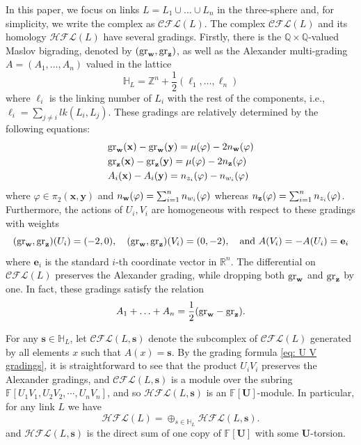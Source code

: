 \documentclass{amsart}
\newtheorem{proposition}[theorem]{Proposition}
\newcommand{\F}{\mathbb{F}}
\newcommand{\cCFL}{\mathcal{C\!F\!L}}
\newcommand{\cHFL}{\mathcal{H\!F\! L}}
\newcommand{\ee}{\mathbf{e}}
\newcommand{\w}{\mathbf{w}}
\newcommand{\x}{\mathbf{x}}
\newcommand{\y}{\mathbf{y}}
\def\gr{\textup{gr}}
\def\w{{\bf{w}}}
\def\z{{\bf{z}}}
\def\x{\mathbf{x}}
\def\y{\mathbf{y}}
\newcommand{\HH}{\mathbb{H}}
\newcommand{\Z}{\mathbb{Z}}
\newcommand{\R}{\mathbb{R}}
\newcommand{\UU}{\mathbf{U}}
\newcommand{\EG}[1]{{\color{red}#1}}
\renewcommand{\ss}{\mathbf{s}}
\begin{document}
In this paper, we focus on links $L=L_1\cup \ldots \cup L_n$ in the three-sphere and, for simplicity, we write the complex as $\cCFL(L)$. The complex $\cCFL(L)$ and its homology $\cHFL(L)$ have several gradings. Firstly, there is the $\mathbb{Q}\times \mathbb{Q}$-valued Maslov bigrading, denoted by $(\gr_{\w}, \gr_{\z})$, as well as the Alexander multi-grading $A=(A_1, \ldots, A_n)$ valued in the lattice
$$\HH_L=\Z^n+\dfrac{1}{2}(\ell_1, \ldots, \ell_n)$$
where $\ell_i$ is the linking number of $L_i$ with the rest of the components, i.e., $\ell_i=\sum_{j\neq i} lk(L_i, L_j)$. These gradings are relatively determined by the following equations:
\begin{equation}\label{eq:relgradings}
\begin{split}
&\gr_{\w}(\x)-\gr_{\w}(\y)=\mu(\varphi)-2n_{\w}(\varphi)\\
&\gr_{\z}(\x)-\gr_{\z}(\y)=\mu(\varphi)-2n_{\z}(\varphi)\\
&A_i(\x)-A_{i}(\y)=n_{z_i}(\varphi)-n_{w_i}(\varphi)
\end{split}
\end{equation}
where $\varphi\in\pi_2(\x,\y)$ and $n_{\w}(\varphi)=\sum_{i=1}^nn_{w_i}(\varphi)$ whereas $n_{\z}(\varphi)=\sum_{i=1}^nn_{z_i}(\varphi)$. Furthermore, the actions of $U_i,V_i$ are homogeneous with respect to these gradings with weights
\begin{equation}
\label{eq: U V gradings}    
(\gr_{\w}, \gr_{\z})(U_i)=(-2, 0), \quad (\gr_{\w}, \gr_{\z})(V_i)=(0, -2), \quad \text{and } A(V_i)=-A(U_i)=\ee_i
\end{equation}
where $\ee_i$ is the standard $i$-th coordinate vector in $\R^n$. 
The differential on $\cCFL(L)$ preserves the Alexander grading, while dropping both $\gr_{\w}$ and $\gr_{\z}$ by  one. In fact, these gradings satisfy the relation
$$A_1+\ldots+A_n=\frac{1}{2} (\gr_{\w}-\gr_{\z}).$$






For any $\ss\in \HH_L$, let $\cCFL(L, \ss)$ denote the subcomplex of $\cCFL(L)$ generated by all elements $x$ such that $A(x)=\ss$. By the grading formula \eqref{eq: U V gradings}, it is straightforward to see that the product $U_iV_i$ preserves the Alexander gradings, and $\cCFL(L, \ss)$ is a module over the subring $\F[U_1V_1, U_2V_2, \cdots, U_nV_n]$, and so $\cHFL(L, \ss)$ is an $\F[\UU]$-module. In particular, for any link $L$ we have
$$\cHFL(L)=\oplus_{s\in \HH_L} \cHFL(L, \ss).$$
and $\cHFL(L, \ss)$ is the direct sum of one copy of $\F[\UU]$ with some $\UU$-torsion. 
\end{document}
